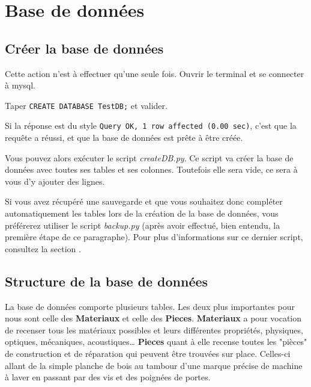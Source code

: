 \documentclass[12pt,a4paper]{article}
\begin{document}
\clearpage
\section{Base de données}

    \subsection{Créer la base de données}\label{createdb}

        Cette action n'est à effectuer qu'une seule fois.
        Ouvrir le terminal %
        et se connecter à mysql.

        Taper \verb+CREATE DATABASE TestDB;+ et valider.
    
        Si la réponse est du style \verb+Query OK, 1 row affected (0.00 sec)+, c'est
        que la requête a réussi, et que la base de données est prête à être créée.

        Vous pouvez alors exécuter le script \emph{createDB.py}. Ce script va créer
        la base de données avec toutes ses tables et ses colonnes. Toutefois elle
        sera vide, ce sera à vous d'y ajouter des lignes.

        Si vous avez récupéré une sauvegarde et que vous souhaitez donc compléter
        automatiquement les tables lors de la création de la base de données, vous
        préférerez utiliser le script \emph{backup.py} (après avoir effectué, bien
        entendu, la première étape de ce paragraphe). Pour plus d'informations sur
        ce dernier script, consultez la section .

    \bigskip
    \subsection{Structure de la base de données}\label{structuredb}
        La base de données comporte plusieurs tables.
        Les deux plus importantes pour nous sont celle des \textbf{Materiaux} et celle des \textbf{Pieces}.
        \textbf{Materiaux} a pour vocation de recenser tous les matériaux possibles
        et leurs différentes propriétés, physiques, optiques, mécaniques, acoustiques\dots
        \textbf{Pieces} quant à elle recense toutes les "pièces" de construction et de réparation
        qui peuvent être trouvées sur place. Celles-ci allant de la simple planche de bois
        au tambour d'une marque précise de machine à laver en passant par des vis et des
        poignées de portes. 
\end{document}
